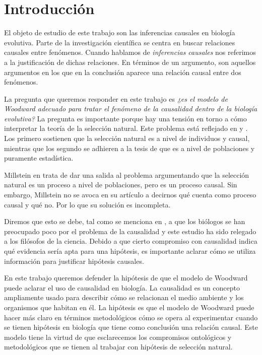 
\chapter*{Introducción}


\noindent El objeto de estudio de este trabajo son las inferencias causales en biología evolutiva. Parte de la investigación científica se centra en buscar relaciones causales entre fenómenos. Cuando hablamos de \textit{inferencias causales} nos referimos a la justificación de dichas relaciones. En términos de un argumento, son aquellos argumentos en los que en la conclusión aparece una relación causal entre dos fenómenos.

La pregunta que queremos responder en este trabajo es \textit{¿es el modelo de Woodward adecuado para tratar el fenómeno de la causalidad dentro de la biología evolutiva?} La pregunta es importante porque hay una tensión en torno a cómo interpretar la teoría de la selección natural. Este problema está reflejado en \cite{Bouchard2004} y \cite{Walsh2002}. Los primero sostienen que la selección natural es a nivel de individuos y causal, mientras que los segundo se adhieren a la tesis de que es a nivel de poblaciones y puramente estadística.

Millstein en \cite{Millstein2006} trata de dar una salida al problema argumentando que la selección natural es un proceso a nivel de poblaciones, pero es un proceso causal. Sin embargo, Millstein no se avoca en su artículo a decirnos qué cuenta como proceso causal y qué no. Por lo que su solución es incompleta.

Diremos que esto se debe, tal como se menciona en \cite{Uller2020}, a que los biólogos se han preocupado poco por el problema de la causalidad y este estudio ha sido relegado a los filósofos de la ciencia. Debido a que cierto compromiso con causalidad indica qué evidencia sería apta para una hipótesis, es importante aclarar cómo se utiliza información para justificar hipótesis causales.

En este trabajo queremos defender la hipótesis de que el modelo de Woodward puede aclarar el uso de causalidad en biología. La causalidad es un concepto ampliamente usado para describir cómo se relacionan el medio ambiente y los organismos que habitan en él. La hipótesis es que el modelo de Woodward puede hacer más claro en términos metodológicos cómo se opera al experimentar cuando se tienen hipótesis en biología que tiene como conclusión una relación causal. Este modelo tiene la virtud de que esclarecemos los compromisos ontológicos y metodológicos que se tienen al trabajar con hipótesis de selección natural.

